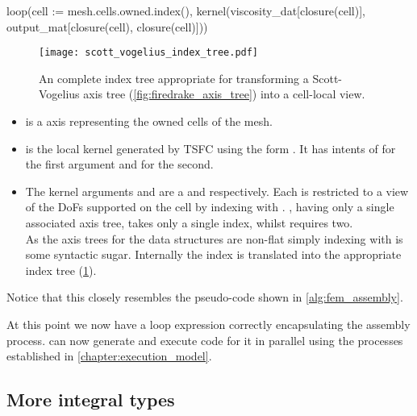 \documentclass[thesis]{subfiles}
\begin{document}
\begin{pyinline}
  loop(cell := mesh.cells.owned.index(),
       kernel(viscosity_dat[closure(cell)],
              output_mat[closure(cell), closure(cell)]))
\end{pyinline}

\begin{figure}
  \centering
  \texttt{[image: scott\_vogelius\_index\_tree.pdf]}
  \caption{
    An complete index tree appropriate for transforming a Scott-Vogelius axis tree (\cref{fig:firedrake_axis_tree}) into a cell-local view.
  }
  \label{fig:firedrake_index_tree}
\end{figure}

\begin{itemize}
  \item
     is a  axis representing the owned cells of the mesh.

  \item
     is the local kernel generated by TSFC using the form .
    It has intents of  for the first argument and  for the second.

  \item
    The kernel arguments  and  are a  and  respectively.
    Each is restricted to a view of the DoFs supported on the cell by indexing with .
    , having only a single associated axis tree, takes only a single index, whilst  requires two. \\
    As the axis trees for the data structures are non-flat simply indexing with  is some syntactic sugar.
    Internally the index is translated into the appropriate index tree (\cref{fig:firedrake_index_tree}).
\end{itemize}

Notice that this closely resembles the pseudo-code shown in \cref{alg:fem_assembly}.

At this point we now have a loop expression correctly encapsulating the assembly process.
 can now generate and execute code for it in parallel using the processes established in \cref{chapter:execution_model}.

\subsection{More integral types}
\end{document}
